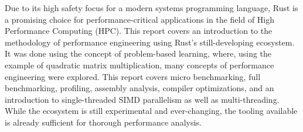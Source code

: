 Due to its high safety focus for a modern systems programming language, Rust is a promising choice for performance-critical applications in the field of High Performance Computing (HPC). This report covers an introduction to the methodology of performance engineering using Rust's still-developing ecosystem. It was done using the concept of problem-based learning, where, using the example of quadratic matrix multiplication, many concepts of performance engineering were explored. This report covers micro benchmarking, full benchmarking, profiling, assembly analysis, compiler optimizations, and an introduction to single-threaded SIMD parallelism as well as multi-threading. While the ecosystem is still experimental and ever-changing, the tooling available is already sufficient for thorough performance analysis.
